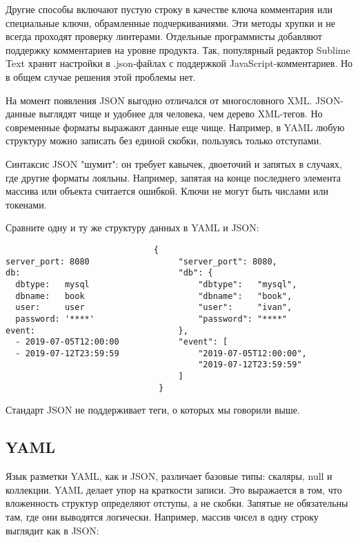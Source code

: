 Другие способы включают пустую строку в качестве ключа комментария или
специальные ключи, обрамленные подчеркиваниями. Эти методы хрупки и не всегда
проходят проверку линтерами. Отдельные программисты добавляют поддержку
комментариев на уровне продукта. Так, популярный редактор Sublime Text хранит
настройки в .json-файлах с поддержкой JavaScript-комментариев. Но в общем случае
решения этой проблемы нет.

На момент появления JSON выгодно отличался от многословного XML. JSON-данные
выглядят чище и удобнее для человека, чем дерево XML-тегов. Но современные
форматы выражают данные еще чище. Например, в YAML любую структуру можно
записать без единой скобки, пользуясь только отступами.

Синтаксис JSON "шумит": он требует кавычек, двоеточий и запятых в случаях, где
другие форматы лояльны. Например, запятая на конце последнего элемента массива
или объекта считается ошибкой. Ключи не могут быть числами или
токенами.

Сравните одну и ту же структуру данных в YAML и JSON:

\begin{verbatim}
                              {
server_port: 8080                  "server_port": 8080,
db:                                "db": {
  dbtype:   mysql                      "dbtype":   "mysql",
  dbname:   book                       "dbname":   "book",
  user:     user                       "user":     "ivan",
  password: '****'                     "password": "****"
event:                             },
  - 2019-07-05T12:00:00            "event": [
  - 2019-07-12T23:59:59                "2019-07-05T12:00:00",
                                       "2019-07-12T23:59:59"
                                   ]
                               }
\end{verbatim}

Стандарт JSON не поддерживает теги, о которых мы говорили выше.

\subsection{YAML}

Язык разметки YAML, как и JSON, различает базовые типы: скаляры, null и
коллекции. YAML делает упор на краткости записи. Это выражается в том, что
вложенность структур определяют отступы, а не скобки. Запятые не обязательны
там, где они выводятся логически. Например, массив чисел в одну строку выглядит
как в JSON:

